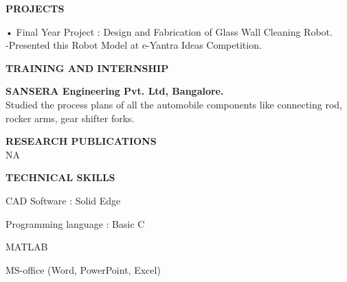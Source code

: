 \documentclass{article}
\begin{document}
\begin{center}

\textbf{\LARGE PROJECTS}
\begin{enumerate}
	
	{\large \item •	Final Year Project : Design and Fabrication of Glass Wall Cleaning Robot.\\
		-Presented this Robot Model at e-Yantra Ideas Competition.}
\end{enumerate}\vspace{15px}


\textbf{\LARGE TRAINING AND INTERNSHIP}
\begin{itemize}
	{\large \item \textbf{SANSERA Engineering Pvt. Ltd, Bangalore.}\\
		Studied the process plans of all the automobile
		components like connecting rod, rocker arms, gear shifter
		forks.}
\end{itemize}\vspace{15px}


\textbf{\LARGE RESEARCH PUBLICATIONS}\\NA\vspace{15px}


\textbf{\LARGE TECHNICAL SKILLS}
\begin{itemize}
	{\large \item CAD Software : Solid Edge}
	{\large \item Programming language : Basic C}
	{\large \item MATLAB }
	{\large \item MS-office (Word, PowerPoint, Excel)}
\end{itemize}\vspace{15px}

\end{center}
\end{document}
